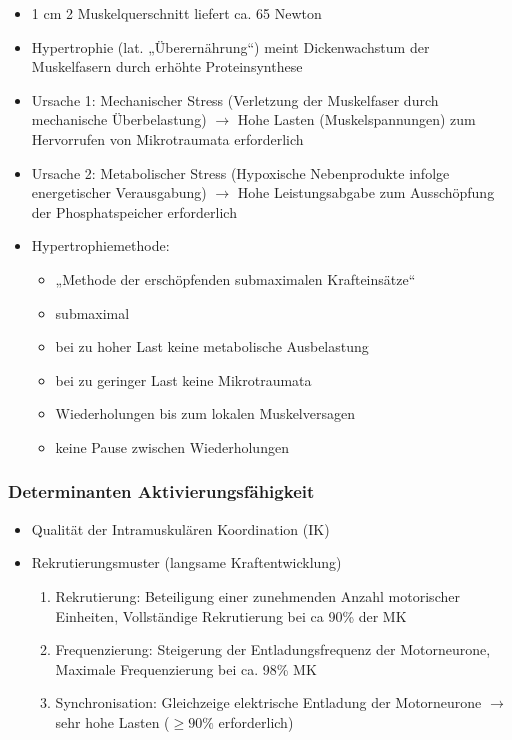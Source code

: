 \begin{minipage}{0.7\textwidth}
\begin{itemize}
    \item 1 cm 2 Muskelquerschnitt liefert ca. 65 Newton
    \item Hypertrophie (lat. „Überernährung“) meint Dickenwachstum der Muskelfasern durch erhöhte Proteinsynthese
    \item Ursache 1: Mechanischer Stress (Verletzung der Muskelfaser durch mechanische Überbelastung) $\rightarrow$ Hohe Lasten (Muskelspannungen) zum Hervorrufen von Mikrotraumata erforderlich
    \item Ursache 2: Metabolischer Stress (Hypoxische Nebenprodukte infolge energetischer Verausgabung) $\rightarrow$ Hohe Leistungsabgabe zum Ausschöpfung der Phosphatspeicher erforderlich
    \item Hypertrophiemethode:
    \begin{itemize}
        \item „Methode der erschöpfenden submaximalen Krafteinsätze“
        \item submaximal
        \item bei zu hoher Last keine metabolische Ausbelastung
        \item bei zu geringer Last keine Mikrotraumata
        \item Wiederholungen bis zum lokalen Muskelversagen
        \item keine Pause zwischen Wiederholungen
    \end{itemize}
\end{itemize}
\end{minipage}

\subsubsection*{Determinanten Aktivierungsfähigkeit}

\begin{itemize}
    \item Qualität der Intramuskulären Koordination (IK)
    \item Rekrutierungsmuster (langsame Kraftentwicklung)
    \begin{enumerate}
        \item Rekrutierung: Beteiligung einer zunehmenden Anzahl motorischer Einheiten, Vollständige Rekrutierung bei ca 90\% der MK
        \item Frequenzierung: Steigerung der Entladungsfrequenz der Motorneurone, Maximale Frequenzierung bei ca. 98\% MK
        \item Synchronisation: Gleichzeige elektrische Entladung der Motorneurone $\rightarrow$ sehr hohe Lasten ($\ge 90 \%$ erforderlich)
    \end{enumerate}
\end{itemize}

